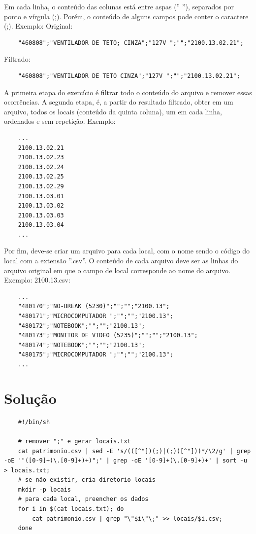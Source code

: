 \documentclass[oneside, 11 pt]{article}
\begin{document}
	Em cada linha, o conteúdo das colunas está entre aspas ('' ''), separados por ponto e vírgula (;). Porém, o conteúdo de alguns campos pode conter o caractere (;). Exemplo:
	Original:
	\begin{lstlisting}
	"460808";"VENTILADOR DE TETO; CINZA";"127V ";"";"2100.13.02.21";
	\end{lstlisting}
	Filtrado:
	\begin{lstlisting}
	"460808";"VENTILADOR DE TETO CINZA";"127V ";"";"2100.13.02.21";
	\end{lstlisting}
	A primeira etapa do exercício é filtrar todo o conteúdo do arquivo e remover essas ocorrências. A segunda etapa, é, a partir do resultado filtrado, obter em um arquivo, todos os locais (conteúdo da quinta coluna), um em cada linha, ordenados e sem repetição.
	Exemplo:
	\begin{lstlisting}
	...
	2100.13.02.21
	2100.13.02.23
	2100.13.02.24
	2100.13.02.25
	2100.13.02.29
	2100.13.03.01
	2100.13.03.02
	2100.13.03.03
	2100.13.03.04
	...
	\end{lstlisting}
	Por fim, deve-se criar um arquivo para cada local, com o nome sendo o código do local com a extensão ''.csv''. O conteúdo de cada arquivo deve ser as linhas do arquivo original em que o campo de local corresponde ao nome do arquivo. Exemplo:
	2100.13.csv:
	\begin{lstlisting}
	...
	"480170";"NO-BREAK (5230)";"";"";"2100.13";
	"480171";"MICROCOMPUTADOR ";"";"";"2100.13";
	"480172";"NOTEBOOK";"";"";"2100.13";
	"480173";"MONITOR DE VIDEO (5235)";"";"";"2100.13";
	"480174";"NOTEBOOK";"";"";"2100.13";
	"480175";"MICROCOMPUTADOR ";"";"";"2100.13";
	...
	\end{lstlisting}
	
	\pagebreak
	
	\section{Solução}
	\begin{lstlisting}
	#!/bin/sh
	
	# remover ";" e gerar locais.txt
	cat patrimonio.csv | sed -E 's/(([^"])(;)|(;)([^"]))*/\2/g' | grep -oE '"([0-9]+(\.[0-9]+)+)";' | grep -oE '[0-9]+(\.[0-9]+)+' | sort -u > locais.txt;
	# se não existir, cria diretorio locais
	mkdir -p locais
	# para cada local, preencher os dados
	for i in $(cat locais.txt); do
		cat patrimonio.csv | grep "\"$i\"\;" >> locais/$i.csv;
	done
	\end{lstlisting}
\end{document}
